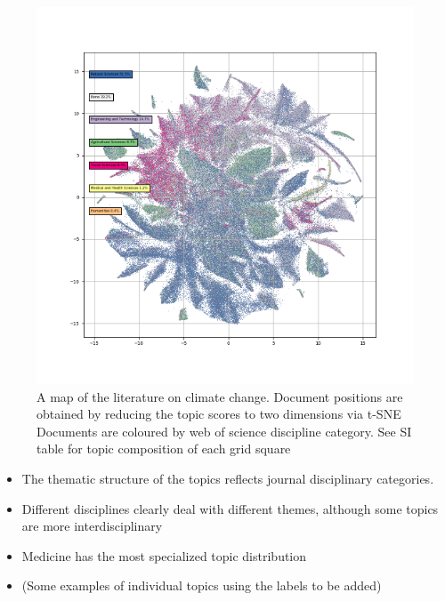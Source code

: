 \documentclass{article}
\begin{document}

\begin{figure}[h!]
	\begin{center}
		\includegraphics[width=1\linewidth]{tsne_results/plots/run_1275_s_0_p100_oecds.png}
		\caption{A map of the literature on climate change. Document positions are obtained by reducing the topic scores to two dimensions via t-SNE Documents are coloured by web of science discipline category. See SI table for topic composition of each grid square}
		\label{map-oecd}
	\end{center}
\end{figure}

\begin{itemize}
	\item The thematic structure of the topics reflects journal disciplinary categories. 
	\item Different disciplines clearly deal with different themes, although some topics are more interdisciplinary 
	\item Medicine has the most specialized topic distribution  
	\item (Some examples of individual topics using the labels to be added)
\end{itemize}
\end{document}
